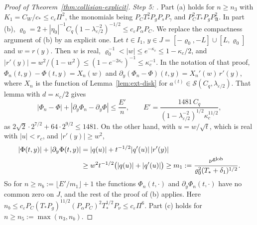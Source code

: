 \documentclass[11pt]{amsart}
\theoremstyle{definition}
\theoremstyle{remark}
\numberwithin{equation}{section}
\newcommand{\eps}{\varepsilon}
\begin{document}
\begin{proof}[Proof of Theorem~\ref{thm:collision-explicit}]
\emph{Step 5: \cite[Proposition~\ref{M-prop:localise}]{Main}.} Part (a) holds for $n\ge n_3$ with $K_1=C_W/c_*\le c_\eps\Pi^2$, the monomials being $P_CT_*^2P_gP_sP_\gamma$ and $P_C^2T_*P_gP_{\mathfrak A}^2$. In part (b), $\varrho_0=2+|\eta_0|^{-1}C_q(1-\lambda_{\eps/2}^{-2})^{-1/2}\le c_\eps P_\alpha P_C$. We replace the compactness argument of (b) by an explicit one. Let $t\in I_1$, $y\in J=[-\varrho_0,-L]\cup[L,\varrho_0]$ and $w=r(y)$. Then $w$ is real, $\varrho_0^{-1}<|w|\le e^{-\kappa_c}\le1-\kappa_c/2$, and $|r'(y)|=w^2/(1-w^2)\le(1-e^{-2\kappa_c})^{-1}\le\kappa_c^{-1}$. In the notation of that proof, $\Phi_n(t,y)-\Phi(t,y)=X_n(w)$ and $\partial_y(\Phi_n-\Phi)(t,y)=X_n'(w)\,r'(y)$, where $X_n$ is the function of Lemma~\ref{lem:ext-disk} for $a^{(t)}\in\mathcal S(C_q,\lambda_{\eps/2})$. That lemma with $d=\kappa_c/2$ gives
\[
|\Phi_n-\Phi|+|\partial_y\Phi_n-\partial_y\Phi|\le\frac{E'}n,\qquad E'=\frac{1481\,C_q}{(1-\lambda_{\eps/2}^{-2})^{1/2}\kappa_c^{11/2}},
\]
as $2\sqrt2\cdot2^{7/2}+64\cdot2^{9/2}\le1481$. On the other hand, with $u=w/\sqrt t$, which is real with $|u|<r_c$, and $|r'(y)|\ge w^2$,
\[
\begin{aligned}
|\Phi(t,y)|+|\partial_y\Phi(t,y)|&=|q(u)|+t^{-1/2}|q'(u)|\,|r'(y)|\\
&\ge w^2t^{-1/2}\bigl(|q(u)|+|q'(u)|\bigr)\ge m_1:=\frac{\nu^{\rm glob}}{\varrho_0^2(T_*+\delta_1)^{1/2}} .
\end{aligned}
\]
So for $n\ge n_b:=\lfloor E'/m_1\rfloor+1$ the functions $\Phi_n(t,\cdot)$ and $\partial_y\Phi_n(t,\cdot)$ have no common zero on $J$, and the rest of the proof of (b) applies. Here $n_b\le c_\eps P_C(T_*P_g)^{11/2}(P_\alpha P_C)^2T_*^{1/2}P_\nu\le c_\eps\Pi^6$. Part (c) holds for $n\ge n_5:=\max(n_3,n_b)$.


\end{proof}
\end{document}

